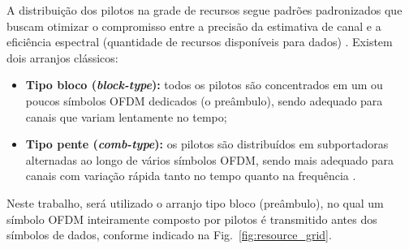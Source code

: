 \documentclass[conference]{IEEEtran}
\begin{document}
A distribuição dos pilotos na grade de recursos segue padrões padronizados que buscam otimizar o compromisso entre a precisão da estimativa de canal e a eficiência espectral (quantidade de recursos disponíveis para dados) \cite{3gpp38211}. Existem dois arranjos clássicos:
\begin{itemize}
    \item \textbf{Tipo bloco (\textit{block-type}):} todos os pilotos são concentrados em um ou poucos símbolos OFDM dedicados (o preâmbulo), sendo adequado para canais que variam lentamente no tempo;
    \item \textbf{Tipo pente (\textit{comb-type}):} os pilotos são distribuídos em subportadoras alternadas ao longo de vários símbolos OFDM, sendo mais adequado para canais com variação rápida tanto no tempo quanto na frequência \cite{hsieh1998}.
\end{itemize}

Neste trabalho, será utilizado o arranjo tipo bloco (preâmbulo), no qual um símbolo OFDM inteiramente composto por pilotos é transmitido antes dos símbolos de dados, conforme indicado na Fig.~\ref{fig:resource_grid}.
\end{document}
